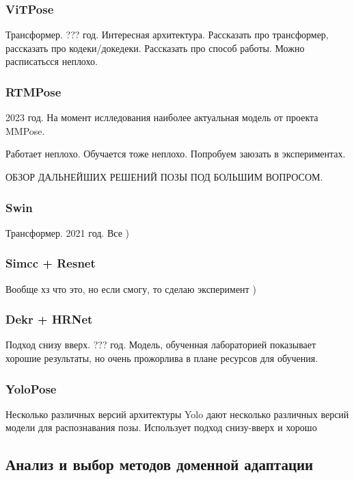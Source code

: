 \subsubsection{ViTPose}

Трансформер. ??? год. Интересная архитектура. Рассказать про трансформер, рассказать про кодеки/докедеки. Рассказать про способ работы. Можно расписатьсся неплохо.

\subsubsection{RTMPose}

2023 год. На момент ислледования наиболее актуальная модель от проекта MMPose.

Работает неплохо. Обучается тоже неплохо. Попробуем заюзать в экспериментах.

\hfill \break

ОБЗОР ДАЛЬНЕЙШИХ РЕШЕНИЙ ПОЗЫ ПОД БОЛЬШИМ ВОПРОСОМ.

\subsubsection{Swin}

Трансформер. 2021 год. Все )

\subsubsection{Simcc + Resnet}

Вообще хз что это, но если смогу, то сделаю эксперимент )

\subsubsection{Dekr + HRNet}

Подход снизу вверх. ??? год. Модель, обученная лабораторией показывает хорошие результаты, но очень прожорлива в плане ресурсов для обучения.

\subsubsection{YoloPose}

Несколько различных версий архитектуры Yolo дают несколько различных версий модели для распознавания позы. Использует подход снизу-вверх и хорошо


\subsection{Анализ и выбор методов доменной адаптации}

